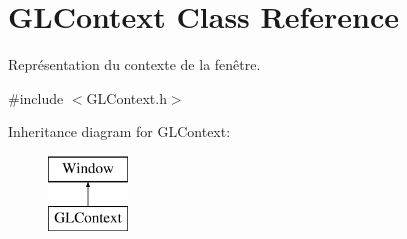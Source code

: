 \hypertarget{class_g_l_context}{}\section{G\+L\+Context Class Reference}
\label{class_g_l_context}


Représentation du contexte de la fenêtre.  




{\ttfamily \#include $<$G\+L\+Context.\+h$>$}

Inheritance diagram for G\+L\+Context\+:\begin{figure}[H]
\begin{center}
\leavevmode
\includegraphics[height=2.000000cm]{class_g_l_context}
\end{center}
\end{figure}
